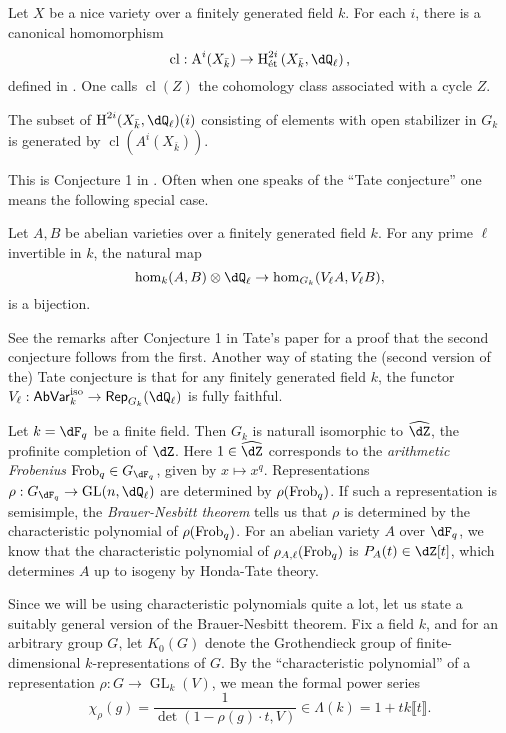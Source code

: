 Let $X$ be a nice variety over a finitely generated field $k$. For each $i$, 
there is a canonical homomorphism 
\[
  \operatorname{cl}:\chow^i(X_{\bar k}) \to \h_\text{\'et}^{2 i}\left(X_{\bar k},\dQ_\ell\right)\text{,}
\]
defined in \cite[VI 2.2.10]{de77}. One calls $\operatorname{cl}(Z)$ the 
cohomology class associated with a cycle $Z$. 

\begin{conjecture}[Tate]
The subset of $\h^{2 i}(X_{\bar k},\dQ_\ell)(i)$ consisting of elements with 
open stabilizer in $G_k$ is generated by $\operatorname{cl}(A^i(X_{\bar k}))$. 
\end{conjecture}

This is Conjecture 1 in \cite{ta65}. Often when one speaks of the ``Tate 
conjecture'' one means the following special case. 

\begin{conjecture}[Tate]
Let $A,B$ be abelian varieties over a finitely generated field $k$. For any 
prime $\ell$ invertible in $k$, the natural map 
\[
  \hom_k(A,B)\otimes\dQ_\ell \to \hom_{G_k}(V_\ell A, V_\ell B) \text{,}
\]
is a bijection. 
\end{conjecture}

See the remarks after Conjecture 1 in Tate's paper for a proof that the second 
conjecture follows from the first. Another way of stating the (second version 
of the) Tate conjecture is that for any finitely generated field $k$, the 
functor $V_\ell:\mathsf{AbVar}_k^\text{iso} \to \mathsf{Rep}_{G_k}(\dQ_\ell)$ 
is fully faithful. 

\begin{example}
Let $k=\dF_q$ be a finite field. Then $G_k$ is naturall isomorphic to 
$\widehat\dZ$, the profinite completion of $\dZ$. Here $1\in \widehat\dZ$ 
corresponds to the \emph{arithmetic Frobenius} $\frob_q\in G_{\dF_q}$, given by 
$x\mapsto x^q$. Representations 
$\rho:G_{\dF_q} \to \gl{n}{\dQ_\ell}$ are determined by 
$\rho(\mathrm{Frob}_q)$. If such a representation is semisimple, the 
\emph{Brauer-Nesbitt theorem} tells us that $\rho$ is determined by the 
characteristic polynomial of $\rho(\mathrm{Frob}_q)$. For an abelian variety $A$ over 
$\dF_q$, we know that the characteristic polynomial of 
$\rho_{A,\ell}(\mathrm{Frob}_q)$ is $P_A(t)\in \dZ[t]$, which determines $A$ up to 
isogeny by Honda-Tate theory. 
\end{example}

Since we will be using characteristic polynomials quite a lot, let us state a 
suitably general version of the Brauer-Nesbitt theorem. Fix a field $k$, and 
for an arbitrary group $G$, let $K_0(G)$ denote the Grothendieck group of 
finite-dimensional $k$-representations of $G$. By the ``characteristic 
polynomial'' of a representation $\rho:G \to \operatorname{GL}_k(V)$, we mean 
the formal power series 
\[
  \chi_\rho(g) = \frac{1}{\det(1-\rho(g)\cdot t, V)} \in \Lambda(k) = 1+t k\llbracket t\rrbracket \text{.}
\]

